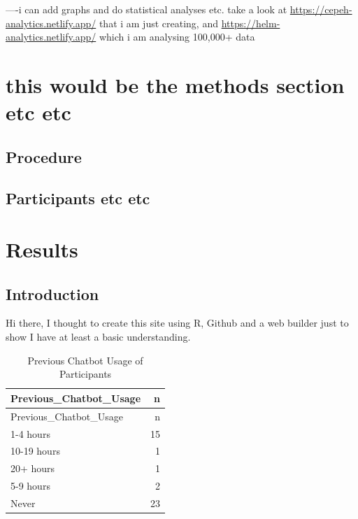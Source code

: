 \documentclass[a4paper, nobind]{templates/ociamthesis}
\begin{document}
----i can add graphs and do statistical analyses etc. take a look at \url{https://cepeh-analytics.netlify.app/} that i am just creating, and \url{https://helm-analytics.netlify.app/} which i am analysing 100,000+ data

\hypertarget{this-would-be-the-methods-section-etc-etc}{%
\chapter{this would be the methods section etc etc}\label{this-would-be-the-methods-section-etc-etc}}

\minitoc 

\hypertarget{procedure}{%
\section{Procedure}\label{procedure}}

\hypertarget{participants-etc-etc}{%
\section{Participants etc etc}\label{participants-etc-etc}}

\hypertarget{rmd-basics}{%
\chapter{Results}\label{rmd-basics}}

\minitoc 

\noindent

\hypertarget{introduction-1}{%
\section{Introduction}\label{introduction-1}}

Hi there, I thought to create this site using R, Github and a web builder just to show I have at least a basic understanding.

\begin{longtable}[]{@{}lr@{}}
\caption{Previous Chatbot Usage of Participants\\
}\tabularnewline
\toprule()
Previous\_Chatbot\_Usage & n \\
\midrule()
\endfirsthead
\toprule()
Previous\_Chatbot\_Usage & n \\
\midrule()
\endhead
1-4 hours & 15 \\
10-19 hours & 1 \\
20+ hours & 1 \\
5-9 hours & 2 \\
Never & 23 \\
\bottomrule()
\end{longtable}
\end{document}
